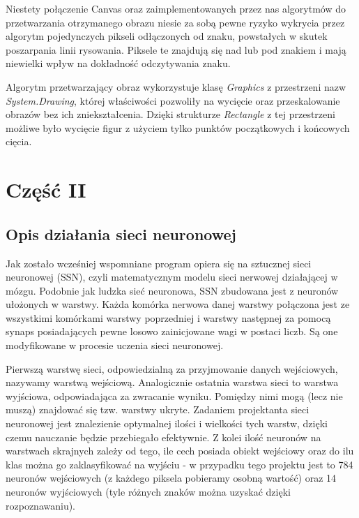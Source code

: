 \documentclass[12pt,a4paper]{article}
\begin{document}
	\vspace{5pt} Niestety połączenie Canvas oraz zaimplementowanych przez nas algorytmów do przetwarzania otrzymanego obrazu niesie za sobą pewne ryzyko wykrycia przez algorytm pojedynczych pikseli odłączonych od znaku, powstałych w skutek poszarpania linii rysowania. Piksele te znajdują się nad lub pod znakiem i mają niewielki wpływ na dokładność odczytywania znaku.
	
    \vspace{5pt} Algorytm przetwarzający obraz wykorzystuje klasę \textit{Graphics} z przestrzeni nazw \\ \textit{System.Drawing}, której właściwości pozwoliły na wycięcie oraz przeskalowanie obrazów bez ich zniekształcenia. Dzięki strukturze \textit{Rectangle} z tej przestrzeni możliwe było wycięcie figur z użyciem tylko punktów początkowych i końcowych cięcia. 
	
    \newpage
\section*{Część II}
\subsection*{Opis działania sieci neuronowej} 
	\hspace{20pt} Jak zostało wcześniej wspomniane program opiera się na sztucznej sieci neuronowej (SSN), czyli matematycznym modelu sieci nerwowej działającej w mózgu. Podobnie jak ludzka sieć neuronowa, SSN zbudowana jest z neuronów ułożonych w warstwy. Każda komórka nerwowa danej warstwy połączona jest ze wszystkimi komórkami warstwy poprzedniej i warstwy następnej za pomocą synaps posiadających pewne losowo zainicjowane wagi w postaci liczb. Są one modyfikowane w procesie uczenia sieci neuronowej.
	
	\vspace{5pt}
	Pierwszą warstwę sieci, odpowiedzialną za przyjmowanie danych wejściowych, nazywamy warstwą wejściową. Analogicznie ostatnia warstwa sieci to warstwa wyjściowa, odpowiadająca za zwracanie wyniku. Pomiędzy nimi mogą (lecz nie muszą) znajdować się tzw. warstwy ukryte. Zadaniem projektanta sieci neuronowej jest znalezienie optymalnej ilości i wielkości tych warstw, dzięki czemu nauczanie będzie przebiegało efektywnie. Z kolei ilość neuronów na warstwach skrajnych zależy od tego, ile cech posiada obiekt wejściowy oraz do ilu klas można go zaklasyfikować na wyjściu - w przypadku tego projektu jest to 784 neuronów wejściowych (z każdego piksela pobieramy osobną wartość) oraz 14 neuronów wyjściowych (tyle różnych znaków można uzyskać dzięki rozpoznawaniu).
	
\end{document}
